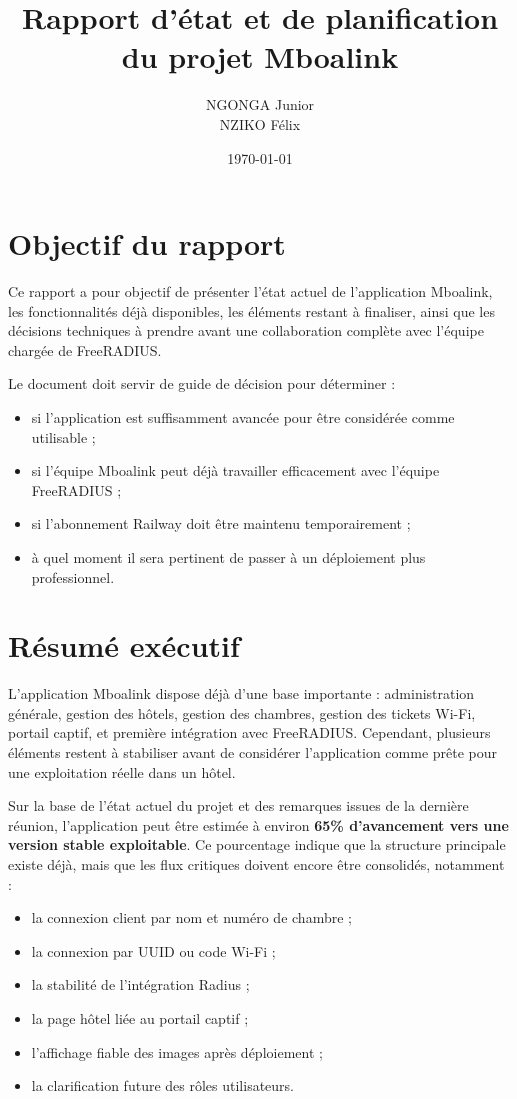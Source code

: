\documentclass[12pt,a4paper]{article}
\title{\textbf{Rapport d'état et de planification du projet Mboalink}}
\author{NGONGA Junior \\ NZIKO Félix}
\date{\today}
\begin{document}
\maketitle
\tableofcontents
\newpage

\section{Objectif du rapport}

Ce rapport a pour objectif de présenter l'état actuel de l'application Mboalink, les fonctionnalités déjà disponibles, les éléments restant à finaliser, ainsi que les décisions techniques à prendre avant une collaboration complète avec l'équipe chargée de FreeRADIUS.

Le document doit servir de guide de décision pour déterminer :

\begin{itemize}
  \item si l'application est suffisamment avancée pour être considérée comme utilisable ;
  \item si l'équipe Mboalink peut déjà travailler efficacement avec l'équipe FreeRADIUS ;
  \item si l'abonnement Railway doit être maintenu temporairement ;
  \item à quel moment il sera pertinent de passer à un déploiement plus professionnel.
\end{itemize}

\section{Résumé exécutif}

L'application Mboalink dispose déjà d'une base importante : administration générale, gestion des hôtels, gestion des chambres, gestion des tickets Wi-Fi, portail captif, et première intégration avec FreeRADIUS. Cependant, plusieurs éléments restent à stabiliser avant de considérer l'application comme prête pour une exploitation réelle dans un hôtel.

Sur la base de l'état actuel du projet et des remarques issues de la dernière réunion, l'application peut être estimée à environ \textbf{65\% d'avancement vers une version stable exploitable}. Ce pourcentage indique que la structure principale existe déjà, mais que les flux critiques doivent encore être consolidés, notamment :

\begin{itemize}
  \item la connexion client par nom et numéro de chambre ;
  \item la connexion par UUID ou code Wi-Fi ;
  \item la stabilité de l'intégration Radius ;
  \item la page hôtel liée au portail captif ;
  \item l'affichage fiable des images après déploiement ;
  \item la clarification future des rôles utilisateurs.
\end{itemize}
\end{document}
